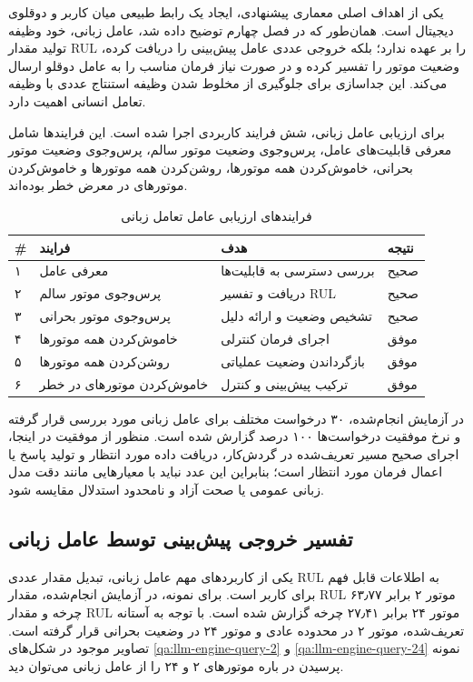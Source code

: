 \documentclass[a4paper,fleqn]{report}
\begin{document}
یکی از اهداف اصلی معماری پیشنهادی، ایجاد یک رابط طبیعی میان کاربر و دوقلوی دیجیتال است. همان‌طور که در فصل چهارم توضیح داده شد، عامل زبانی، خود وظیفه تولید مقدار \gls{RUL} را بر عهده ندارد؛ بلکه خروجی عددی عامل پیش‌بینی را دریافت کرده، وضعیت موتور را تفسیر کرده و در صورت نیاز فرمان مناسب را به عامل دوقلو ارسال می‌کند. این جداسازی برای جلوگیری از مخلوط شدن وظیفه استنتاج عددی با وظیفه تعامل انسانی اهمیت دارد.

برای ارزیابی عامل زبانی، شش فرایند کاربردی اجرا شده است. این فرایند‌ها شامل معرفی قابلیت‌های عامل، پرس‌وجوی وضعیت موتور سالم، پرس‌وجوی وضعیت موتور بحرانی، خاموش‌کردن همه موتورها، روشن‌کردن همه موتورها و خاموش‌کردن موتورهای در معرض خطر بوده‌اند.

\begin{table}[ht]
	\centering
	\caption{فرایند‌های ارزیابی عامل تعامل زبانی}
	\label{tab:llm-case-final}
	\begin{tabular}{p{0.6cm}p{3.3cm}p{5cm}p{3cm}}
		\toprule
		\textbf{\#} & \textbf{فرایند} & \textbf{هدف} & \textbf{نتیجه} \\
		\midrule
		۱ & معرفی عامل & بررسی دسترسی به قابلیت‌ها & صحیح \\
		۲ & پرس‌وجوی موتور سالم & دریافت و تفسیر \gls{RUL} & صحیح \\
		۳ & پرس‌وجوی موتور بحرانی & تشخیص وضعیت و ارائه دلیل & صحیح \\
		۴ & خاموش‌کردن همه موتورها & اجرای فرمان کنترلی & موفق \\
		۵ & روشن‌کردن همه موتورها & بازگرداندن وضعیت عملیاتی & موفق \\
		۶ & خاموش‌کردن موتورهای در خطر & ترکیب پیش‌بینی و کنترل & موفق \\
		\bottomrule
	\end{tabular}
\end{table}

در آزمایش انجام‌شده، ۳۰ درخواست مختلف برای عامل زبانی مورد بررسی قرار گرفته و نرخ موفقیت درخواست‌ها ۱۰۰ درصد گزارش شده است. منظور از موفقیت در اینجا، اجرای صحیح مسیر تعریف‌شده در گردش‌کار، دریافت داده مورد انتظار و تولید پاسخ یا اعمال فرمان مورد انتظار است؛ بنابراین این عدد نباید با معیارهایی مانند دقت مدل زبانی عمومی یا صحت آزاد و نامحدود استدلال مقایسه شود.

\subsection{تفسیر خروجی پیش‌بینی توسط عامل زبانی}

یکی از کاربردهای مهم عامل زبانی، تبدیل مقدار عددی \gls{RUL} به اطلاعات قابل فهم برای کاربر است. برای نمونه، در آزمایش انجام‌شده، مقدار \gls{RUL} موتور ۲ برابر ۶۳٫۷۷ چرخه و مقدار \gls{RUL} موتور ۲۴ برابر ۲۷٫۴۱ چرخه گزارش شده است. با توجه به آستانه تعریف‌شده، موتور ۲ در محدوده عادی و موتور ۲۴ در وضعیت بحرانی قرار گرفته است. تصاویر موجود در شکل‌های 
\ref{qa:llm-engine-query-2}
و
\ref{qa:llm-engine-query-24}
نمونه پرسیدن در باره موتور‌های ۲ و ۲۴ را از عامل زبانی می‌توان دید.
\end{document}
